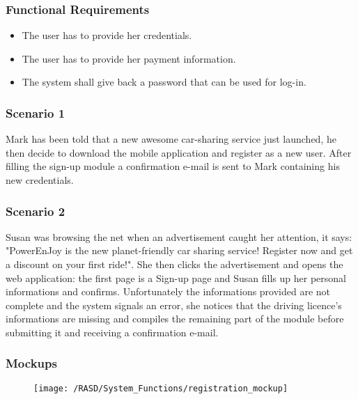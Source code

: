 \subsubsection{Functional Requirements}
\begin{itemize}
  \item The user has to provide her credentials.
  \item The user has to provide her payment information.
  \item The system shall give back a password that can be used for log-in.
\end{itemize}


\subsubsection{Scenario 1}
Mark has been told that a new awesome car-sharing service just launched, he then decide to download the mobile application and register as a new user. After filling the sign-up module a confirmation e-mail is sent to Mark containing his new credentials.


\subsubsection{Scenario 2}
Susan was browsing the net when an advertisement caught her attention, it says: "PowerEnJoy is the new planet-friendly car sharing service! Register now and get a discount on your first ride!". She then clicks the advertisement and opens the web application: the first page is a Sign-up page and Susan fills up her personal informations and confirms. Unfortunately the informations provided are not complete and the system signals an error, she notices that the driving licence's informations are missing and compiles the remaining part of the module before submitting it and receiving a confirmation e-mail.


\subsubsection{Mockups}
\begin{figure}[!ht]
  \centering
  \vspace{0.2cm}
  \texttt{[image: /RASD/System\_Functions/registration\_mockup]}\\
  \vspace{0.4cm}
  \label{fig:registration_mockup} 
\end{figure}


